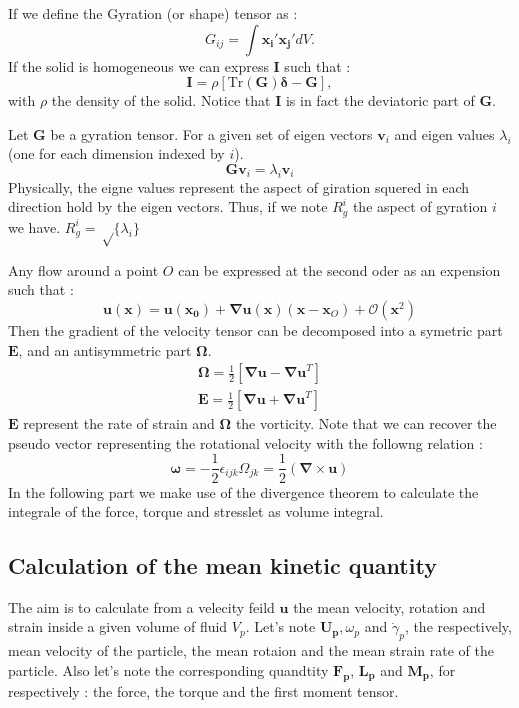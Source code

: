 \documentclass[10pt,a4paper,openany]{article}
\theoremstyle{mytheoremstyle}
\theoremstyle{mytheoremstyle}
\theoremstyle{myproblemstyle}
\begin{document}
If we define the Gyration (or shape) tensor as :
\begin{equation}
    G_{ij} = \int \bm{x_i'}\bm{x_j'} dV.
\end{equation}
If the solid is homogeneous we can express $\bm{I}$ such that : 
\begin{equation}
    \bm{I} = \rho\left[\text{Tr}(\bm{G})\bm{\delta} - \bm{G}\right],
\end{equation}
with $\rho$ the density of the solid. 
Notice that $\bm{I}$ is in fact the deviatoric part of $\bm{G}$.  
\begin{definition}
    Let $\bm{G}$ be a gyration tensor. 
    For a given set of eigen vectors $\bm{v}_i$ and eigen values $\lambda_i$ (one for each dimension indexed by $i$). 
    $$\bm{G}\bm{v}_i = \lambda_i \bm{v}_i$$
    Physically, the eigne values represent the aspect of giration squered in each direction hold by the eigen vectors. 
    Thus, if we note $R_g^i$ the aspect of gyration $i$ we have.
    $R_g^i = \sqrt\{\lambda_i\} $
\end{definition}
Any flow around a point $O$ can be expressed at the second oder as an expension such that \citep{guazzelli2011} : 
\begin{equation}
    \bm{u}(\bm{x}) = \bm{u}(\bm{x_0}) + \bm{\nabla}\bm{u}(\bm{x})(\bm{x} - \bm{x}_O) + \mathcal{O}(\bm{x}^2)
\end{equation}
Then the gradient of the velocity tensor can be decomposed into a symetric part $\bm{E}$, and an antisymmetric part $\bm{\Omega}$.
\begin{align*}
    \bm{\Omega} = \frac{1}{2}\left[\bm{\nabla u} -\bm{\nabla u}^T\right]\\
    \bm{E} = \frac{1}{2}\left[\bm{\nabla u} +\bm{\nabla u}^T\right]
\end{align*}
$\bm{E}$ represent the rate of strain and $\bm{\Omega}$ the vorticity. 
Note that we can recover the pseudo vector representing the rotational velocity with the followng relation :
\begin{equation*}
    \bm{\omega} = -\frac{1}{2} \epsilon_{ijk}\Omega_{jk} = \frac{1}{2} \left(\bm{\nabla}\times \bm{u}\right)
\end{equation*}
In the following part we make use of the divergence theorem to calculate the integrale of the force, torque and stresslet as volume integral. 


\subsection{Calculation of the mean kinetic quantity}
The aim is to calculate from a velecity feild $\bm{u}$ the mean velocity, rotation and strain inside a given volume of fluid $V_p$.
Let's note $\bm{U_p},\omega_p$ and $\dot{\gamma}_p$, the respectively, mean velocity of the particle, the mean rotaion and the mean strain rate of the particle. 
Also let's note the corresponding quandtity $\bm{F_p}$, $\bm{L_p}$ and $\bm{M_p}$, for respectively :
the force, the torque and the first moment tensor. 
\end{document}
